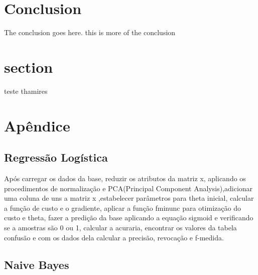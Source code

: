 \documentclass[10pt, conference, compsocconf]{IEEEtran}
\begin{document}
\section{Conclusion}
The conclusion goes here. this is more of the conclusion


\section{section}
teste thamires

%
\section{Apêndice}

\subsection{Regressão Logística}
Após carregar os dados da base, reduzir os atributos da matriz x, aplicando os procedimentos de normalização e PCA(Principal Component Analysis),adicionar uma coluna de uns a matriz x ,estabelecer parâmetros para theta inicial, calcular a função de custo e o gradiente, aplicar a função fminunc para otimização do custo e theta, fazer a predição da base aplicando a equação sigmoid e verificando se a amostras são 0 ou 1, calcular a acuraria, encontrar os valores da tabela confusão e com os dados dela calcular a precisão, revocação e f-medida.

\subsection{Naive Bayes}



\end{document}
